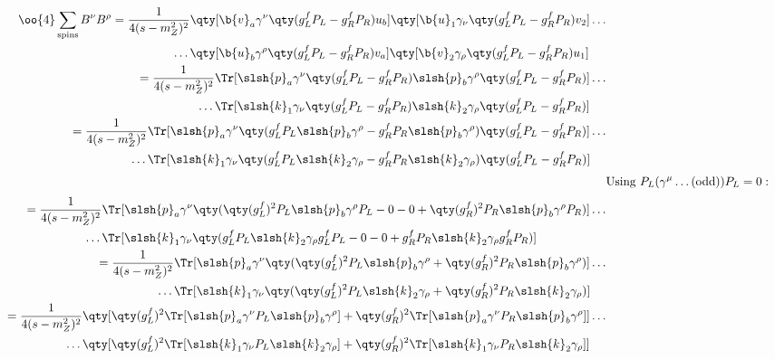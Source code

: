 	\begin{align}
		\begin{split}
			\oo{4}\sum_\text{spins}B^\nu B^\rho&=
			\frac{1}{4(s-m_Z^2)^2}
			\qty[\b{v}_a\gamma^\nu\qty(g_L^fP_L-g_R^fP_R)u_b]
			\qty[\b{u}_1\gamma_\nu\qty(g_L^fP_L-g_R^fP_R)v_2]
			\ldots\\&\qquad\qquad\quad\ldots
			\qty[\b{u}_b\gamma^\rho\qty(g_L^fP_L-g_R^fP_R)v_a]
			\qty[\b{v}_2\gamma_\rho\qty(g_L^fP_L-g_R^fP_R)u_1]
		\end{split}
		\\
		\begin{split}
			&=\frac{1}{4(s-m_Z^2)^2}
			\Tr[\slsh{p}_a\gamma^\nu\qty(g_L^fP_L-g_R^fP_R)\slsh{p}_b\gamma^\rho\qty(g_L^fP_L-g_R^fP_R)]
			\ldots\\&\qquad\qquad\quad\ldots
			\Tr[\slsh{k}_1\gamma_\nu\qty(g_L^fP_L-g_R^fP_R)\slsh{k}_2\gamma_\rho\qty(g_L^fP_L-g_R^fP_R)]
		\end{split}
		\\
		\label{eqn:BnBp_trace}
		\begin{split}
			&=\frac{1}{4(s-m_Z^2)^2}
			\Tr[\slsh{p}_a\gamma^\nu\qty(g_L^fP_L\slsh{p}_b\gamma^\rho-g_R^fP_R\slsh{p}_b\gamma^\rho)\qty(g_L^fP_L-g_R^fP_R)]
			\ldots\\&\qquad\qquad\quad\ldots
			\Tr[\slsh{k}_1\gamma_\nu\qty(g_L^fP_L\slsh{k}_2\gamma_\rho-g_R^fP_R\slsh{k}_2\gamma_\rho)\qty(g_L^fP_L-g_R^fP_R)]
		\end{split}
		\\[0.25em]
		&\text{Using } P_L(\gamma^\mu\ldots(\text{odd}))P_L=0:\label{eqn:projection_rule}
		\\[0.25em]
		\begin{split}
			&=\frac{1}{4(s-m_Z^2)^2}
			\Tr[\slsh{p}_a\gamma^\nu
			\qty(
				\qty(g_L^f)^2P_L\slsh{p}_b\gamma^\rho P_L
				-0
				-0
				+\qty(g_R^f)^2 P_R\slsh{p}_b\gamma^\rho P_R
				)]
				\ldots\\&\qquad\qquad\quad\ldots
			\Tr[\slsh{k}_1\gamma_\nu
			\qty(
				g_L^fP_L\slsh{k}_2\gamma_\rho g_L^fP_L-0-0
				+g_R^fP_R\slsh{k}_2\gamma_\rho g_R^fP_R
				)]
		\end{split}
		\\
		\begin{split}
			&=\frac{1}{4(s-m_Z^2)^2}
			\Tr[\slsh{p}_a\gamma^\nu
			\qty(
				\qty(g_L^f)^2P_L\slsh{p}_b\gamma^\rho
				+\qty(g_R^f)^2 P_R\slsh{p}_b\gamma^\rho
				)]
			\ldots\\&\qquad\qquad\quad\ldots
			\Tr[\slsh{k}_1\gamma_\nu
			\qty(
				\qty(g_L^f)^2P_L\slsh{k}_2\gamma_\rho
				+\qty(g_R^f)^2P_R\slsh{k}_2\gamma_\rho 
				)]
		\end{split}
		\\
		\begin{split}
			&=\frac{1}{4(s-m_Z^2)^2}
			\qty[
				\qty(g_L^f)^2
				\Tr[\slsh{p}_a\gamma^\nu P_L\slsh{p}_b\gamma^\rho]
				+
				\qty(g_R^f)^2
				\Tr[ \slsh{p}_a\gamma^\nu P_R\slsh{p}_b\gamma^\rho]
			]
			\ldots\\&\qquad\qquad\quad\ldots
			\qty[
				\qty(g_L^f)^2
				\Tr[\slsh{k}_1\gamma_\nu P_L\slsh{k}_2\gamma_\rho]
				+
				\qty(g_R^f)^2
				\Tr[\slsh{k}_1\gamma_\nu P_R\slsh{k}_2\gamma_\rho]
				]
		\end{split}
	\end{align}
